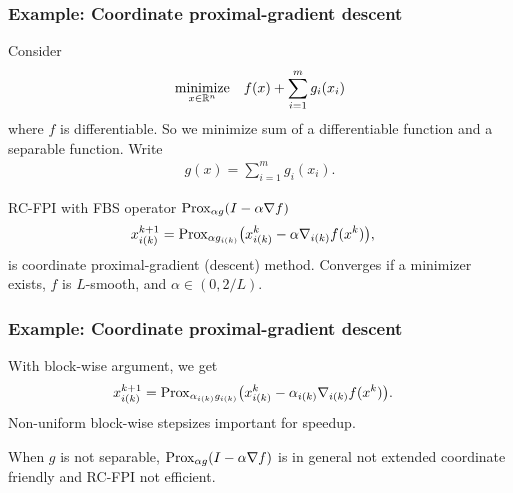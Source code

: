 \documentclass[10pt,mathserif]{beamer}
\begin{document}
\begin{frame}
\frametitle{Example: Coordinate proximal-gradient descent}
Consider 
\[
\begin{array}{ll}
\underset{x\in \mathbb{R}^n}{\mbox{minimize}}& \displaystyle{f(x)+\sum_{i=1}^{m} g_i(x_i)}
\end{array}
\]
where $f$ is differentiable. So we minimize sum of a differentiable function and a separable function.
Write
\begin{align*}
  g(x) = \sum_{i=1}^{m} g_i(x_i).
\end{align*}

\medskip\pause

RC-FPI with FBS operator $\mathrm{Prox}_{\alpha g}(I-\alpha\nabla f)$
\begin{align*}
  x^{k+1}_{i(k)} & = \mathrm{Prox}_{\alpha g_{i(k)}}\big(x^{k}_{i(k)} - \alpha \nabla_{i(k)}f(x^{k})\big),
\end{align*}
is coordinate proximal-gradient (descent) method.
Converges if a minimizer exists, $f$ is $L$-smooth, and $\alpha\in(0,2/L)$.
\end{frame}


\begin{frame}
\frametitle{Example: Coordinate proximal-gradient descent}

With block-wise argument, we get
\begin{align*}
  x^{k+1}_{i(k)} & = \mathrm{Prox}_{\alpha_{i(k)}g_{i(k)}}\big(x^{k}_{i(k)} - \alpha_{i(k)} \nabla_{i(k)}f(x^{k})\big).
\end{align*}
Non-uniform block-wise stepsizes important for speedup.


\vspace{0.2in}

When $g$ is not separable, $\mathrm{Prox}_{\alpha g}(I-\alpha\nabla f)$ is in general not extended coordinate friendly and RC-FPI not efficient.

\end{frame}
\end{document}
